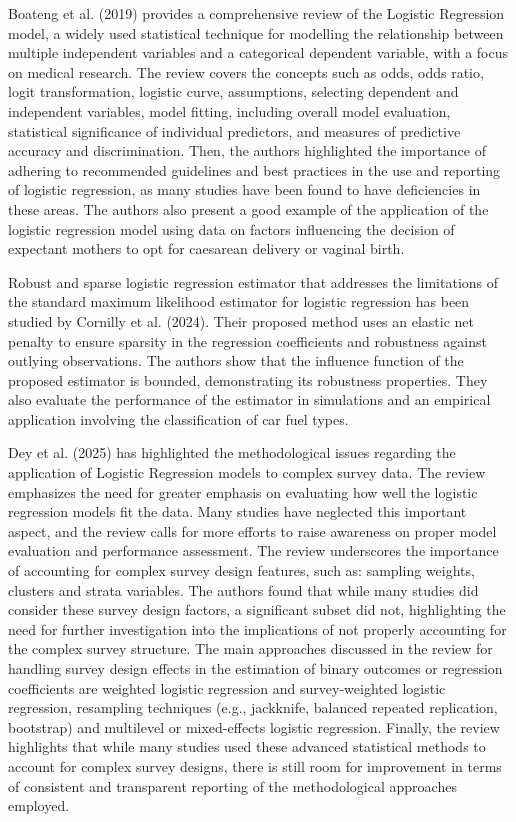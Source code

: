 \documentclass[11pt,a4paper]{article}
\begin{document}
Boateng et al. (2019) provides a comprehensive review of the Logistic Regression model, a widely used statistical technique for modelling the relationship between multiple independent variables and a categorical dependent variable, with a focus on medical research. The review covers the concepts such as odds, odds ratio, logit transformation, logistic curve, assumptions, selecting dependent and independent variables, model fitting, including overall model evaluation, statistical significance of individual predictors, and measures of predictive accuracy and discrimination. Then, the authors highlighted the importance of adhering to recommended guidelines and best practices in the use and reporting of logistic regression, as many studies have been found to have deficiencies in these areas. The authors also present a good example of the application of the logistic regression model using data on factors influencing the decision of expectant mothers to opt for caesarean delivery or vaginal birth. 

Robust and sparse logistic regression estimator that addresses the limitations of the standard maximum likelihood estimator for logistic regression has been studied by Cornilly et al. (2024). Their proposed method uses an elastic net penalty to ensure sparsity in the regression coefficients and robustness against outlying observations. The authors show that the influence function of the proposed estimator is bounded, demonstrating its robustness properties. They also evaluate the performance of the estimator in simulations and an empirical application involving the classification of car fuel types.

Dey et al. (2025) has highlighted the methodological issues regarding the application of Logistic Regression models to complex survey data.  The review emphasizes the need for greater emphasis on evaluating how well the logistic regression models fit the data. Many studies have neglected this important aspect, and the review calls for more efforts to raise awareness on proper model evaluation and performance assessment. The review underscores the importance of accounting for complex survey design features, such as: sampling weights, clusters and strata variables. The authors found that while many studies did consider these survey design factors, a significant subset did not, highlighting the need for further investigation into the implications of not properly accounting for the complex survey structure. The main approaches discussed in the review for handling survey design effects in the estimation of binary outcomes or regression coefficients are weighted logistic regression and survey-weighted logistic regression, resampling techniques (e.g., jackknife, balanced repeated replication, bootstrap) and multilevel or mixed-effects logistic regression. Finally, the review highlights that while many studies used these advanced statistical methods to account for complex survey designs, there is still room for improvement in terms of consistent and transparent reporting of the methodological approaches employed.
\end{document}
